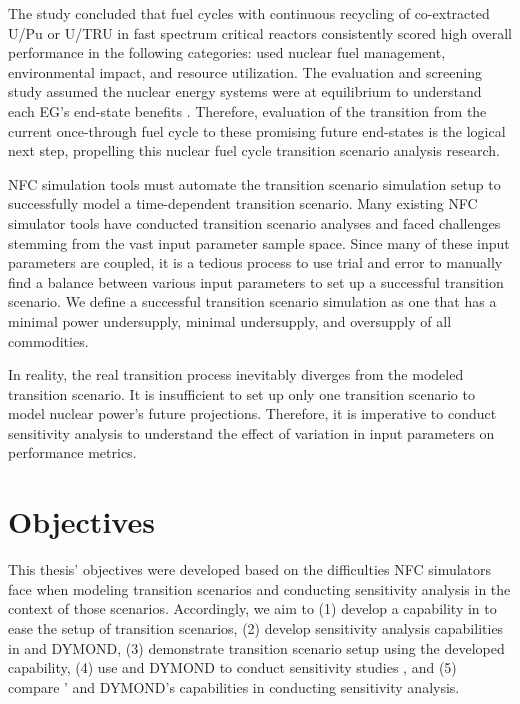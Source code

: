 The study concluded that fuel cycles with continuous recycling
of co-extracted U/Pu or U/TRU in fast spectrum critical reactors
consistently scored high overall performance in the following 
categories: used nuclear fuel management, environmental impact, 
and resource utilization. 
The evaluation and screening study assumed
the nuclear energy systems were at equilibrium to understand each \gls{EG}'s
end-state benefits \cite{feng_standardized_2016}. 
Therefore, evaluation of the transition from the current 
once-through fuel cycle to these promising 
future end-states \cite{feng_standardized_2016} 
is the logical next step, propelling this
nuclear fuel cycle transition scenario analysis research. 

\gls{NFC} simulation tools must automate the transition scenario simulation 
setup to successfully model a time-dependent transition scenario. 
Many existing \gls{NFC} simulator tools have conducted 
transition scenario analyses 
\cite{feng_standardized_2016,bae_standardized_2019,coquelet-pascal_cosi6:_2015}
and faced challenges stemming from the vast input parameter
sample space.
Since many of these input parameters are coupled, it is 
a tedious process to use trial and error to manually find a balance 
between various input parameters to set up a successful transition 
scenario. 
We define a successful transition scenario simulation as one that 
has a minimal power undersupply, minimal undersupply, 
and oversupply of all commodities. 
 
In reality, the real transition process inevitably diverges
from the modeled transition scenario. 
It is insufficient to set up only one transition scenario to model 
nuclear power's future projections.
Therefore, it is imperative to conduct sensitivity analysis to understand 
the effect of variation in input parameters on 
performance metrics. 

\section{Objectives}
This thesis' objectives were developed based on the difficulties 
\gls{NFC} simulators face when modeling transition scenarios 
and conducting sensitivity analysis in the context of those scenarios.
Accordingly, we aim to 
(1) develop a capability in \Cyclus to ease the setup of 
transition scenarios, 
(2) develop sensitivity analysis capabilities in \Cyclus and DYMOND, 
(3) demonstrate \Cyclus transition scenario setup using the 
developed capability,
(4) use \Cyclus and DYMOND to conduct sensitivity studies
, and
(5) compare \Cyclus' and DYMOND's capabilities in conducting sensitivity 
analysis. 
